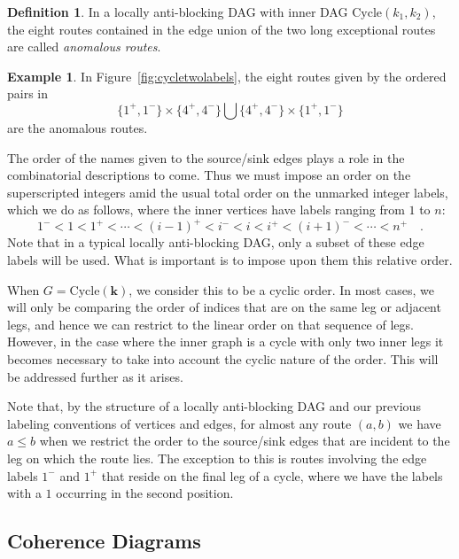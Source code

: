\documentclass[12pt]{amsart}
\theoremstyle{definition}
\newtheorem{definition}[theorem]{Definition}
\newtheorem{example}[theorem]{Example}
\newcommand{\defn}[1]{\emph{\color{blue} #1}}
\newcommand\bk{\mathbf{k}}
\newcommand\Cycle{\mathrm{Cycle}}
\begin{document}
\begin{definition}
    In a locally anti-blocking DAG with inner DAG $\Cycle(k_1,k_2)$, the eight routes contained in the edge union of the two long exceptional routes are called \defn{anomalous routes}.
\end{definition}

\begin{example}\label{ex:anomalousroutes}
    In Figure~\ref{fig:cycletwolabels}, the eight routes given by the ordered pairs in
    \[
    \{1^+,1^-\}\times \{4^+,4^-\}\bigcup \{4^+,4^-\}\times \{1^+,1^-\}
    \]
    are the anomalous routes.
\end{example}

The order of the names given to the source/sink edges plays a role in the combinatorial descriptions to come. 
Thus we must impose an order on the superscripted integers amid the usual total order on the unmarked integer labels, which we do as follows, where the inner vertices have labels ranging from $1$ to $n$:    
\begin{equation}\label{eqn:order}
1^- < 1 < 1^+ < \cdots< (i-1)^+ < i^- < i < i^+ < (i+1)^- < \cdots < n^+ \quad .
\end{equation}
Note that in a typical locally anti-blocking DAG, only a subset of these edge labels will be used.
What is important is to impose upon them this relative order.

When $G=\Cycle(\bk)$, we consider this to be a cyclic order.
In most cases, we will only be comparing the order of indices that are on the same leg or adjacent legs, and hence we can restrict to the linear order on that sequence of legs. 
However, in the case where the inner graph is a cycle with only two inner legs it becomes necessary to take into account the cyclic nature of the order.
This will be addressed further as it arises.

Note that, by the structure of a locally anti-blocking DAG and our previous labeling conventions of vertices and edges, for almost any route $(a,b)$ we have $a\leq b$ when we restrict the order to the source/sink edges that are incident to the leg on which the route lies.
The exception to this is routes involving the edge labels $1^-$ and $1^+$ that reside on the final leg of a cycle, where we have the labels with a $1$ occurring in the second position.


\subsection{Coherence Diagrams}\label{sec:coherencediagrams}
\end{document}
